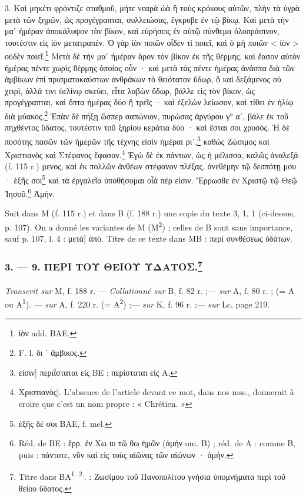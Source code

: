 \documentclass[a4paper, 11pt, oneside, polutonikogreek, french]{article}
\begin{document}
3. Καὶ μηκέτι φρόντιζε σταθμοῦ, μήτε νεαρὰ ὠὰ ἢ τοὺς κρόκους αὐτῶν, πλὴν τὰ ὑγρὰ μετὰ τῶν ξηρῶν, ὡς προγέγραπται, συλλειώσας, ἔγκρυβε ἐν τῷ βίκῳ. Καὶ μετὰ τὴν μαʹ ἡμέραν ἀποκάλυψον τὸν βίκον, καὶ εὑρήσεις ἐν αὐτῷ σύνθεμα ὁλοπράσινον, τουτέστιν εἰς ἰὸν μετατραπέν. Ὁ γὰρ ἰὸν ποιῶν οἶδεν τί ποιεῖ, καὶ ὁ μὴ ποιῶν < ἰὸν > οὐδὲν ποιεῖ.\footnote{ἰὸν add. BAE.} Μετὰ δὲ τὴν μαʹ ἡμέραν ἄρον τὸν βίκον ἐκ τῆς θέρμης, καὶ ἔασον αὐτὸν ἡμέρας πέντε χωρὶς θέρμης ὁποίας οὖν · καὶ μετὰ τὰς πέντε ἡμέρας ἀνάσπα διὰ τῶν ἀμβίκων ἐπὶ πρισματοκαύστων ἀνθράκων τὸ θειότατον ὕδωρ, ὃ καὶ δεξάμενος οὐ χειρὶ, ἀλλά τινι ὑελίνῳ σκεύει, εἶτα λαβὼν ὕδωρ, βάλλε εἰς τὸν βίκον, ὡς προγέγραπται, καὶ ὄπτα ἡμέρας δύο ἢ τρεῖς · καὶ ἐξελὼν λείωσον, καὶ τίθει ἐν ἡλίῳ διὰ μύακος.\footnote{F. l. δι ᾽ ἄμβικος.} Ἐπὰν δὲ πήξῃ ὥσπερ σαπώνιον, πυρώσας ἀργύρου γ° αʹ, βάλε ἐκ τοῦ πηχθέντος ὕδατος, τουτέστιν τοῦ ξηρίου κεράτια δύο · καὶ ἔσται σοι χρυσός. Ἡ δὲ ποσότης πασῶν τῶν ἡμερῶν τῆς τέχνης εἰσὶν ἡμέραι ριʹ,\footnote{εἰσιν] περιΐσταται εἰς BE ; περίσταται εἰς A.} καθὼς Ζώσιμος καὶ Χριστιανὸς καὶ Στέφανος ἔφασαν.\footnote{Χριστιανὸς]. L'absence de l'article devant ce mot, dans nos mss., donnerait à croire que c'est un nom propre : « Chrétien. »} Ἐγὼ δὲ ἐκ πάντων, ὡς ἡ μέλισσα, καλῶς ἀναλεξά- (f. 115 r.) μενος, καὶ ἐκ πολλῶν ἀνθέων στέφανον πλέξας, ἀνεθέμην τῷ δεσπότῃ μου · ἑξῆς σοι\footnote{ἑξῆς δέ σοι BAE, f. mel.} καὶ τὰ ἐργαλεῖα ὑποθήσομαι οἷά πέρ εἰσιν. Ἔρρωσθε ἐν Χριστῷ τῷ Θεῷ Ἰησοῦ.\footnote{Réd. de BE : ἔρρ. ἐν Χω ιυ τῶ θω ἡμῶν (ἀμήν om. B) ; réd. de A : comme B, puis : πάντοτε, νῦν καὶ εἰς τοὺς αἰῶνας τῶν αἰώνων · ἀμήν.} Ἀμήν.

Suit dans M (f. 115 r.) et dans B (f. 188 r.) une copie du texte 3, 1, 1 (ci-dessus, p. 107). On a donné les variantes de M (M\textsuperscript{2}) ; celles de B sont sans importance, sauf p. 107, l. 4 : μετὰ] ἀπὸ. Titre de ce texte dans MB : περὶ συνθέσεως ὑδάτων.

\bigskip
\centerline{\EightStarTaper}
\centerline{\EightStarTaper\EightStarTaper}
\bigskip

\subsubsection[3. --- 9. ΠΕΡΙ ΤΟΥ ΘΕΙΟΥ ΥΔΑΤΟΣ.]{3. --- 9. ΠΕΡΙ ΤΟΥ ΘΕΙΟΥ ΥΔΑΤΟΣ.\footnote{Titre dans BA\textsuperscript{1. 2.}. : Ζωσίμου τοῦ Πανοπολίτου γνήσια ὑπομνήματα περὶ τοῦ θείου ὕδατος.}}
\paragraph{}
\emph{Transcrit sur} M, f. 188 r. --- \emph{Collationné sur} B, f. 82 r. ;--- \emph{sur} A, f. 80 r. ; (= A ou A\textsuperscript{1}). --- \emph{sur} A, f. 220 r. (= A\textsuperscript{2}) ;--- \emph{sur} K, f. 96 r. ;--- \emph{sur} Lc, page 219.
\end{document}
